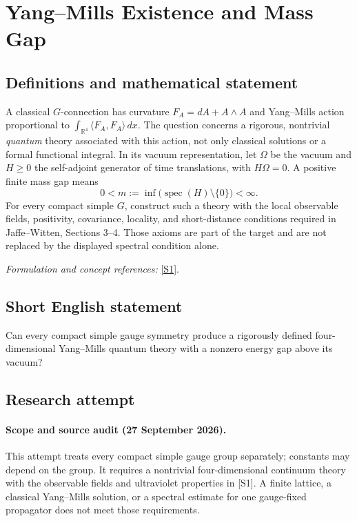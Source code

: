 \documentclass[11pt]{article}
\begin{document}
\section*{\texorpdfstring{Yang–Mills Existence and Mass Gap}{Yang–Mills Existence and Mass Gap}}\label{statement}
\subsection{Definitions and mathematical statement}
A classical $G$-connection has curvature $F_A=dA+A\wedge A$ and Yang--Mills action proportional to $\int_{{\mathbb{R}}^4}\langle F_A,F_A\rangle\,dx$. The question concerns a rigorous, nontrivial \emph{quantum} theory associated with this action, not only classical solutions or a formal functional integral. In its vacuum representation, let $\Omega$ be the vacuum and $H\ge0$ the self-adjoint generator of time translations, with $H\Omega=0$. A positive finite mass gap means
\[
 0<m:=\inf\bigl(\operatorname{spec}(H)\setminus\{0\}\bigr)<\infty.
\]
For every compact simple $G$, construct such a theory with the local observable fields, positivity, covariance, locality, and short-distance conditions required in Jaffe--Witten, Sections 3--4. Those axioms are part of the target and are not replaced by the displayed spectral condition alone.
\par\smallskip\textit{Formulation and concept references:} \href{https://www.claymath.org/wp-content/uploads/2022/06/yangmills.pdf}{[S1]}.

\subsection{Short English statement}
Can every compact simple gauge symmetry produce a rigorously defined four-dimensional Yang--Mills quantum theory with a nonzero energy gap above its vacuum?
\subsection{Research attempt}

\paragraph{Scope and source audit (27 September 2026).}
This attempt treats every compact simple gauge group separately; constants may
 depend on the group. It requires a nontrivial four-dimensional continuum
 theory with the observable fields and ultraviolet properties in [S1]. A
 finite lattice, a classical Yang--Mills solution, or a spectral estimate for
 one gauge-fixed propagator does not meet those requirements.
\end{document}
